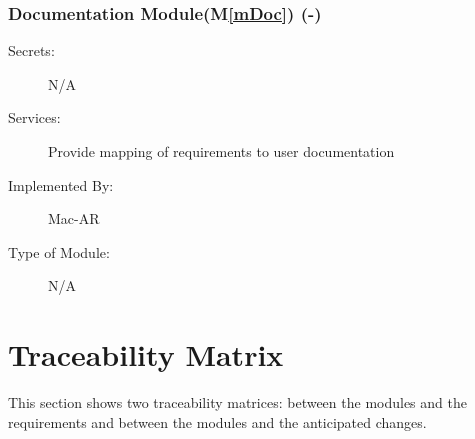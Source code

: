 \documentclass[12pt, titlepage]{article}
\newcommand{\mref}[1]{M\ref{#1}}
\begin{document}
\subsubsection{Documentation Module(\mref{mDoc}) (-)}
\begin{description}
\item[Secrets:] N/A
\item[Services:]Provide mapping of requirements to user documentation
\item[Implemented By:] Mac-AR
\item[Type of Module:] N/A
\end{description}

\section{Traceability Matrix} \label{SecTM}

This section shows two traceability matrices: between the modules and the
requirements and between the modules and the anticipated changes.
\end{document}
